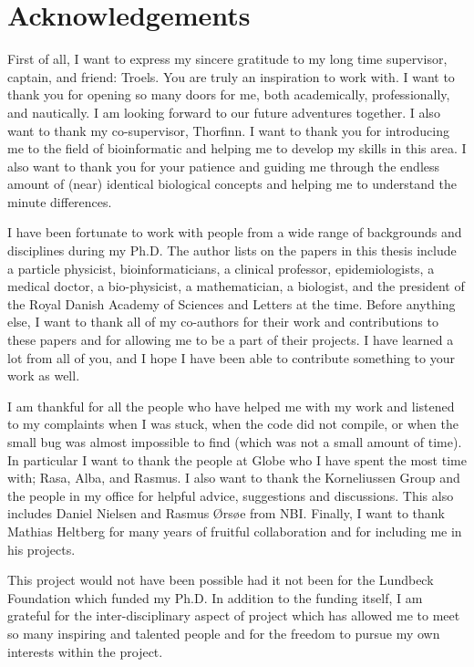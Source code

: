 \chapter{Acknowledgements}

First of all, I want to express my sincere gratitude to my long time supervisor, captain, and friend: Troels. You are truly an inspiration to work with. I want to thank you for opening so many doors for me, both academically, professionally, and nautically. I am looking forward to our future adventures together.
I also want to thank my co-supervisor, Thorfinn. I want to thank you for introducing me to the field of bioinformatic and helping me to develop my skills in this area. I also want to thank you for your patience and guiding me through the endless amount of (near) identical biological concepts and helping me to understand the minute differences.

I have been fortunate to work with people from a wide range of backgrounds and disciplines during my Ph.D. The author lists on the papers in this thesis include a particle physicist, bioinformaticians, a clinical professor, epidemiologists, a medical doctor, a bio-physicist, a mathematician, a biologist, and the president of the Royal Danish Academy of Sciences and Letters at the time. Before anything else, I want to thank all of my co-authors for their work and contributions to these papers and for allowing me to be a part of their projects. I have learned a lot from all of you, and I hope I have been able to contribute something to your work as well.

I am thankful for all the people who have helped me with my work and listened to my complaints when I was stuck, when the code did not compile, or when the small bug was almost impossible to find (which was not a small amount of time). In particular I want to thank the people at Globe who I have spent the most time with; Rasa, Alba, and Rasmus. I also want to thank the Korneliussen Group and the people in my office for helpful advice, suggestions and discussions. This also includes Daniel Nielsen and Rasmus Ørsøe from NBI. Finally, I want to thank Mathias Heltberg for many years of fruitful collaboration and for including me in his projects.

This project would not have been possible had it not been for the Lundbeck Foundation which funded my Ph.D. In addition to the funding itself, I am grateful for the inter-disciplinary aspect of project which has allowed me to meet so many inspiring and talented people and  for the freedom to pursue my own interests within the project.


